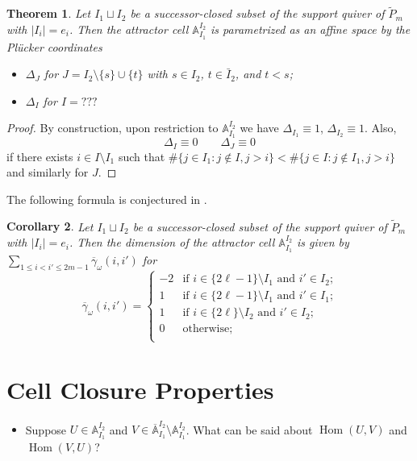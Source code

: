 \documentclass{amsart}
\newtheorem{theorem}{Theorem}
\newtheorem{corollary}[theorem]{Corollary}
\numberwithin{equation}{section}
\renewcommand{\AA}{\mathbb{A}}
\newcommand{\Hom}{\operatorname{Hom}}
\begin{document}
  \begin{theorem}
    Let $I_1\sqcup I_2$ be a successor-closed subset of the support quiver of $\tilde P_m$ with $|I_i|=e_i$.
    Then the attractor cell $\AA_{I_1}^{I_2}$ is parametrized as an affine space by the Pl\"ucker coordinates
    \begin{itemize}
      \item $\Delta_J$ for $J=I_2\setminus\{s\}\cup\{t\}$ with $s\in I_2$, $t\in\bar{I}_2$, and $t<s$;
      \item $\Delta_I$ for $I=???$
    \end{itemize}
  \end{theorem}
  \begin{proof}
    By construction, upon restriction to $\AA_{I_1}^{I_2}$ we have $\Delta_{I_1}\equiv 1$, $\Delta_{I_2}\equiv 1$.
    Also,
    \[\Delta_I\equiv 0 \qquad \Delta_J\equiv 0\]
    if there exists $i\in I\setminus I_1$ such that $\#\{j\in I_1:j\notin I, j>i\} < \#\{j\in I:j\notin I_1,j>i\}$ and similarly for $J$.
  \end{proof}

  The following formula is conjectured in \cite{rupel-weist}.
  \begin{corollary}
    Let $I_1\sqcup I_2$ be a successor-closed subset of the support quiver of $\tilde P_m$ with $|I_i|=e_i$.
    Then the dimension of the attractor cell $\AA_{I_1}^{I_2}$ is given by $\sum\limits_{1 \le i < i' \le 2m-1}\overline{\gamma}_\omega(i,i')$ for
    \begin{equation}
      \overline{\gamma}_\omega(i,i')=\begin{cases}
        -2 & \text{if $i\in \{2\ell-1\}\setminus I_1$ and $i'\in I_2$;}\\ 
        1 & \text{if $i\in \{2\ell-1\}\setminus I_1$ and $i'\in I_1$;}\\ 
        1 & \text{if $i\in \{2\ell\}\setminus I_2$ and $i'\in I_2$;}\\ 
        0 & \text{otherwise;}\\ 
      \end{cases}
    \end{equation} 
  \end{corollary}

\section{Cell Closure Properties}

  \begin{itemize}
    \item Suppose $U\in\AA_{I_1}^{I_2}$ and $V\in\overline{\AA}_{I_1}^{I_2}\setminus\AA_{I_1}^{I_2}$.
      What can be said about $\Hom(U,V)$ and $\Hom(V,U)$?
  \end{itemize}
\end{document}
